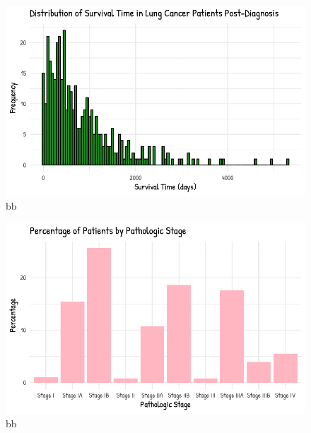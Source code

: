 \documentclass[
  letterpaper,
  DIV=11,
  numbers=noendperiod]{scrartcl}
\begin{document}
\begin{figure}

{\centering \includegraphics{paper_files/figure-pdf/fig-bills-1.pdf}

}

\caption{\label{fig-bills-1}bb}

\end{figure}

\begin{figure}

{\centering \includegraphics{paper_files/figure-pdf/fig-bills-2.pdf}

}

\caption{\label{fig-bills-2}bb}

\end{figure}
\end{document}
